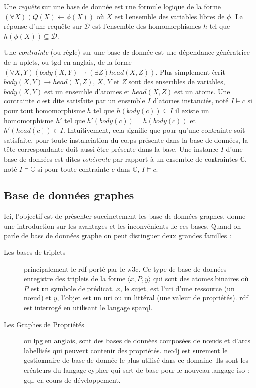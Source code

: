 Une \textit{requête} sur une base de donnée est une formule logique de la forme $(\forall X)(Q(X) \gets \phi(X))$ où $X$ est l'ensemble des variables libres de $\phi$.
La réponse d'une requête sur $\mathcal{D}$ est l'ensemble des homomorphismes $h$ tel que $h(\phi(X)) \subseteq \mathcal{D}$.

Une \textit{contrainte} (ou règle) sur une base de donnée est une dépendance génératrice de n-uplets, ou \gls{tgd} en anglais, de la forme $(\forall X, Y)(body(X, Y) \to (\exists Z)head(X, Z))$.
Plus simplement écrit $body(X, Y) \to head(X, Z)$, $X$, $Y$ et $Z$ sont des ensembles de variables, $body(X, Y)$ est un ensemble d'atomes et $head(X, Z)$ est un atome.
Une contrainte $c$ est dite satisfaite par un ensemble $I$ d'atomes instanciés, noté $I \vDash c$ si pour tout homomorphisme $h$ tel que $h(body(c)) \subseteq I$ il existe un homomorphisme $h'$ tel que $h'(body(c)) = h(body(c))$ et $h'(head(c)) \in I$.
Intuitivement, cela signifie que pour qu'une contrainte soit satisfaite, pour toute instanciation du corps présente dans la base de données, la tête correspondante doit aussi être présente dans la base.
Une instance $I$ d'une base de données est dites \textit{cohérente} par rapport à un ensemble de contraintes $\mathbb{C}$, noté $I \vDash \mathbb{C}$ si pour toute contrainte $c$ dans $\mathbb{C}$, $I \vDash c$.

\subsection{Base de données graphes}
\label{sec:update:pre:graph}

Ici, l'objectif est de présenter succinctement les base de données graphes.
\cite{pokornyGraphDatabasesTheir2015} donne une introduction sur les avantages et les inconvénients de ces bases.
Quand on parle de base de données graphe on peut distinguer deux grandes familles :
\begin{description}
    \item[Les bases de triplets] principalement le \gls{rdf} porté par le \gls{w3c}.
        Ce type de base de données enregistre des triplets de la forme $\langle x, P, y \rangle$ qui sont des atomes binaires où $P$ est un symbole de prédicat, $x$, le sujet, est l'\gls{uri} d'une ressource (un nœud) et $y$, l'objet est un \gls{uri} ou un littéral (une valeur de propriétés).
        \gls{rdf} est interrogé en utilisant le langage \gls{sparql}.
    \item[Les Graphes de Propriétés] ou \gls{lpg} en anglais, sont des bases de données composées de nœuds et d'arcs labellisés qui peuvent contenir des propriétés.
        \gls{neo4j} est surement le gestionnaire de base de donnée le plus utilisé dans ce domaine.
        Ils sont les créateurs du langage \gls{cypher} qui sert de base pour le nouveau langage \gls{iso} : \gls{gql}, en cours de développement.
\end{description}

